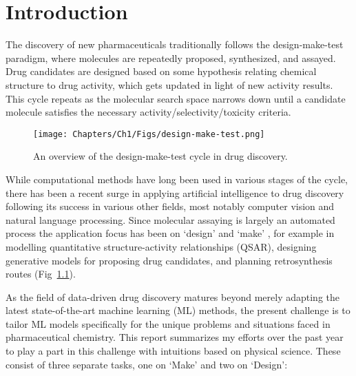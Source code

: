\chapter{Introduction}
The discovery of new pharmaceuticals traditionally follows the design-make-test paradigm, where molecules are repeatedly proposed, synthesized, and assayed. Drug candidates are designed based on some hypothesis relating chemical structure to drug activity, which gets updated in light of new activity results. This cycle repeats as the molecular search space narrows down until a candidate molecule satisfies the necessary activity/selectivity/toxicity criteria.

\begin{figure}[!h] %
\centering
\texttt{[image: Chapters/Ch1/Figs/design-make-test.png]}
\caption{\label{fig:cycle} An overview of the design-make-test cycle in drug discovery.}
\end{figure}

While computational methods have long been used in various stages of the cycle, there has been a recent surge in applying artificial intelligence to drug discovery following its success in various other fields, most notably computer vision and natural language processing. Since molecular assaying is largely an automated process the application focus has been on `design' and `make' \cite{Coley2019AutonomousProgress}, for example in modelling quantitative structure-activity relationships (QSAR), designing generative models for proposing drug candidates, and planning retrosynthesis routes (Fig~\ref{fig:cycle}). 

As the field of data-driven drug discovery matures beyond merely adapting the latest state-of-the-art machine learning (ML) methods, the present challenge is to tailor ML models specifically for the unique problems and situations faced in pharmaceutical chemistry. This report summarizes my efforts over the past year to play a part in this challenge with intuitions based on physical science. These consist of three separate tasks, one on `Make' and two on `Design':

